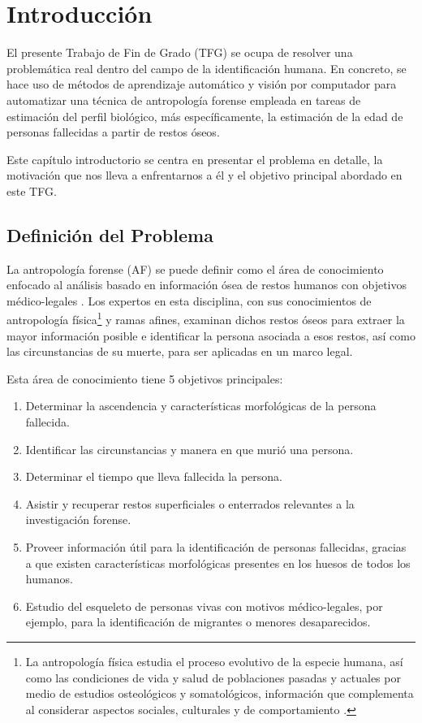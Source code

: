 \chapter{Introducción}
El presente Trabajo de Fin de Grado (TFG) se ocupa de resolver una problemática real dentro del campo de la identificación humana. En concreto, se hace uso de métodos de aprendizaje automático y visión por computador para automatizar una técnica de antropología forense empleada en tareas de estimación del perfil biológico, más específicamente, la estimación de la edad de personas fallecidas a partir de restos óseos. 

Este capítulo introductorio se centra en presentar el problema en detalle, la motivación que nos lleva a enfrentarnos a él y el objetivo principal abordado en este TFG. 


\section{Definición del Problema}
\label{daIntro_ProblemDef}
La antropología forense (AF) se puede definir como el área de conocimiento enfocado al análisis basado en información ósea de restos humanos con objetivos médico-legales \cite{byers_introduction_2016,RefWorks:RefID:17-christensen2019forensic}. Los expertos en esta disciplina, con sus conocimientos de antropología física\footnote{La antropología física estudia el proceso evolutivo de la especie humana, así como las condiciones de vida y salud de poblaciones pasadas y actuales por medio de estudios osteológicos y somatológicos, información que complementa al considerar aspectos sociales, culturales y de comportamiento \cite{antrofisica}.} y ramas afines, examinan dichos restos óseos para extraer la mayor información posible e identificar la persona asociada a esos restos, así como las circunstancias de su muerte, para ser aplicadas en un marco legal. 

Esta área de conocimiento tiene 5 objetivos principales: 

\begin{enumerate}
    \item Determinar la ascendencia y características morfológicas de la persona fallecida.
    \item Identificar las circunstancias y manera en que murió una persona.
    \item Determinar el tiempo que lleva fallecida la persona.
    \item Asistir y recuperar restos superficiales o enterrados relevantes a la investigación forense.
    \item Proveer información útil para la identificación de personas fallecidas, gracias a que existen características morfológicas presentes en los huesos de todos los humanos.
    \item Estudio del esqueleto de personas vivas con motivos médico-legales, por ejemplo, para la identificación de migrantes o menores desaparecidos.
\end{enumerate}

